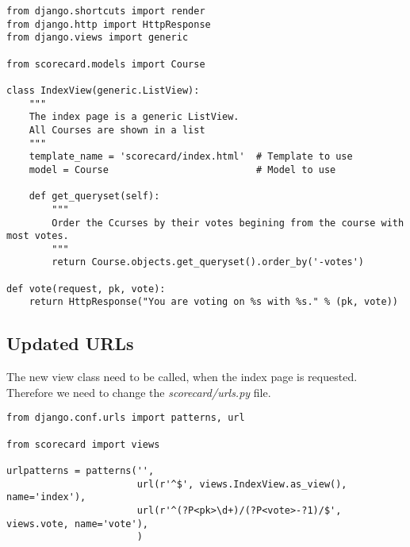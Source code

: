 \begin{lstlisting}[style=Python, caption=views.py, label=lst:views.py1]
from django.shortcuts import render
from django.http import HttpResponse
from django.views import generic

from scorecard.models import Course

class IndexView(generic.ListView):
    """
    The index page is a generic ListView.
    All Courses are shown in a list
    """
    template_name = 'scorecard/index.html'  # Template to use
    model = Course                          # Model to use

    def get_queryset(self):
        """
        Order the Ccurses by their votes begining from the course with most votes.
        """
        return Course.objects.get_queryset().order_by('-votes')

def vote(request, pk, vote):
    return HttpResponse("You are voting on %s with %s." % (pk, vote))
\end{lstlisting}

\subsection{Updated URLs}

The new view class need to be called, when the index page is requested. Therefore we need to change the \emph{scorecard/urls.py} file.

\begin{lstlisting}[style=Python, caption=scorecard/urls.py, label=lst:scorecard_urls.py1]
from django.conf.urls import patterns, url

from scorecard import views

urlpatterns = patterns('',
                       url(r'^$', views.IndexView.as_view(), name='index'),
                       url(r'^(?P<pk>\d+)/(?P<vote>-?1)/$', views.vote, name='vote'),
                       )
\end{lstlisting}

